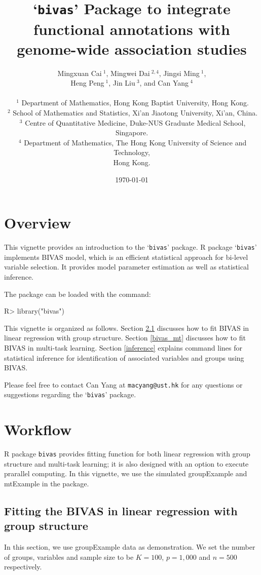 \documentclass[11pt]{article}
\title{`\texttt{bivas}' Package to integrate functional
annotations with genome-wide association studies}
\author{Mingxuan Cai$~^1$, Mingwei Dai$~^{2,4}$, Jingsi Ming$~^1$, \\
Heng Peng$~^1$, Jin Liu$~^3$, and Can Yang$~^4$\\
\\
$~^1$ Department of Mathematics, Hong Kong Baptist University, Hong Kong.\\
$~^2$ School of Mathematics and Statistics, Xi'an Jiaotong University, Xi'an, China.\\
$~^3$ Centre of Quantitative Medicine, Duke-NUS Graduate Medical School, Singapore.\\
$~^4$ Department of Mathematics, The Hong Kong University of Science and Technology,\\
Hong Kong.\\
}
\date{\today}
\begin{document}

\maketitle

\section{Overview}

This vignette provides an introduction to the `\texttt{bivas}' package.
R package `\texttt{bivas}' implements BIVAS model,
which is an efficient statistical approach for bi-level variable selection. It provides model parameter estimation as well as statistical inference.

The package can be loaded with the command:


\begin{Schunk}
\begin{Sinput}
R> library("bivas")
\end{Sinput}
\end{Schunk}

This vignette is organized as follows.
Section \ref{bivas} discusses how to fit BIVAS in linear regression with group structure.
Section \ref{bivas_mt} discusses how to fit BIVAS in multi-task learning.
Section \ref{inference} explains command lines for statistical inference for identification of associated variables and groups using BIVAS.


Please feel free to contact Can Yang at \texttt{macyang@ust.hk} for any questions or suggestions regarding the `\texttt{bivas}' package.

\section{Workflow}\label{workflow}

R package \texttt{bivas} provides fitting function for both linear regression with group structure and multi-task learning;
it is also designed with an option to execute prarallel computing. In this vignette, we use the simulated groupExample and mtExample in the package.

\subsection{Fitting the BIVAS in linear regression with group structure}\label{bivas}

In this section, we use groupExample data as demonstration. We set the number of groups, variables and sample size to be $K=100$, $p=1,000$ and $n=500$ respectively.
\end{document}
